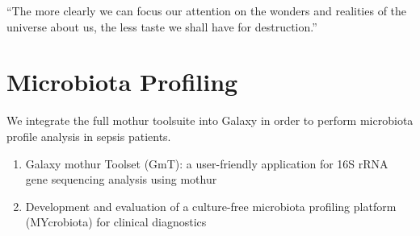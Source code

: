 \begin{savequote}[75mm]
“The more clearly we can focus our attention on the wonders and realities of the universe about us, the less taste we shall have for destruction.”
\end{savequote}

\chapter{Microbiota Profiling}\label{chapter:microbiota}
\setcounter{figure}{-1}
\setcounter{table}{-1}
\setcounter{section}{-1}

We integrate the full mothur toolsuite into Galaxy in order to perform microbiota profile analysis in sepsis patients.

\begin{enumerate}
\itemsep-0.5em
\item Galaxy mothur Toolset (GmT): a user-friendly application for 16S rRNA gene sequencing analysis using mothur
\item Development and evaluation of a culture-free microbiota profiling platform (MYcrobiota) for clinical diagnostics
\end{enumerate}
